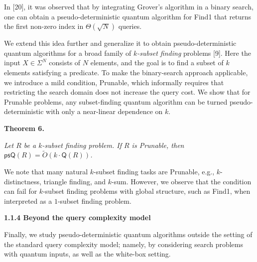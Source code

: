 \documentclass[10pt,a4paper]{article}
\begin{document}
In [20], it was observed that by integrating Grover’s algorithm in a binary search, one can obtain a pseudo-deterministic quantum algorithm for Find1 that returns the first non-zero index in $\Theta(\sqrt{N})$ queries.\par




We extend this idea further and generalize it to obtain pseudo-deterministic quantum algorithms for a broad family of \emph{$k$-subset finding} problems [9]. Here the input $X\in\Sigma^{N}$ consists of $N$ elements, and the goal is to find a subset of $k$ elements satisfying a predicate. To make the binary-search approach applicable, we introduce a mild condition, Prunable, which informally requires that restricting the search domain does not increase the query cost. We show that for Prunable problems, any subset-finding quantum algorithm can be turned pseudo-deterministic with only a near-linear dependence on $k$.\par





\par\medskip\noindent\textbf{
\textbf{Theorem 6}\textbf{.}
}\par



\emph{Let ${R}$ be a $k$-subset finding problem. If ${R}$ is Prunable, then $\mathsf{psQ}({R})=\tilde{O}(k\cdot\mathsf{Q}({R}))$.}\par






We note that many natural $k$-subset finding tasks are Prunable, e.g., $k$-distinctness, triangle finding, and $k$-sum. However, we observe that the condition can fail for $k$-subset finding problems with global structure, such as Find1, when interpreted as a $1$-subset finding problem.\par





\par\medskip\noindent\textbf{
1.1.4 Beyond the query complexity model}\par




Finally, we study pseudo-deterministic quantum algorithms outside the setting of the standard query complexity model; namely, by considering search problems with quantum inputs, as well as the white-box setting.\par
\end{document}
